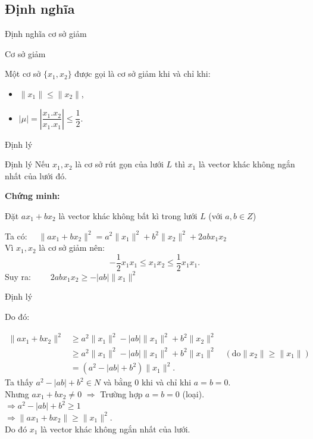 \documentclass{beamer}
\numberwithin{equation}{section}
\begin{document}
\subsection{Định nghĩa}
\begin{frame}{Định nghĩa cơ sở giảm}
\begin{block}{Cơ sở giảm}

Một cơ sở $\{x_1, x_2\}$ được gọi là cơ sở giảm khi và chỉ khi:

\begin{itemize}
\item $\|x_1\| \leq \|x_2\|$,
\item $|\mu| = \left|\dfrac{x_1.x_2}{x_1.x_1}\right| \leq \dfrac{1}{2}$.
\end{itemize}

\end{block}
\end{frame}
\begin{frame}{Định lý}
\begin{block}{Định lý}
Nếu $x_1, x_2$ là cơ sở rút gọn của lưới $L$
thì $x_1$ là vector khác không ngắn nhất của lưới đó.
\end{block}

\textbf{Chứng minh:}

Đặt $ax_1 + bx_2$ là vector khác không bất kì trong lưới $L$ (với $a, b \in Z$)

Ta có: \hspace{4cm}$ \quad \|ax_1 + bx_2\|^2 = a^2\|x_1\|^2 + b^2\|x_2\|^2 + 2abx_1x_2$\\
Vì $x_1, x_2$ là cơ sở giảm nên: $$-\frac{1}{2}x_1x_1 \leq x_1x_2 \leq \frac{1}{2}x_1x_1 \text{.}$$
Suy ra: \hspace{3cm} $\qquad 2abx_1x_2 \geq -|ab|\|x_1\|^2 $

\end{frame}
\begin{frame}{Định lý}

Do đó:

$$
\begin{aligned}
\|ax_1 + bx_2\|^2 &\geq a^2\|x_1\|^2 - |ab|\|x_1\|^2 + b^2\|x_2\|^2 \\
& \geq a^2\|x_1\|^2 - |ab|\|x_1\|^2 + b^2\|x_1\|^2 \quad (\text{do}\|x_2\| \geq \|x_1\|)\\
& = (a^2 - |ab| + b^2) \|x_1\|^2 \text{.}
\end{aligned}
$$
Ta thấy $a^2 - |ab| + b^2 \in N$ và bằng 0 khi và chỉ khi $a = b = 0$.\\
Nhưng \quad $ax_1 + bx_2 \ne 0$ \qquad $\Rightarrow$ \qquad Trường hợp $a = b = 0$ (loại).\\
\hspace*{3cm}$\Rightarrow a^2 - |ab| + b^2 \geq 1$\\
\hspace*{3cm}$ \Rightarrow \|ax_1 + bx_2\| \geq \|x_1\|^2$.\\
Do đó $x_1$ là vector khác không ngắn nhất của lưới.
\end{frame}
\end{document}
